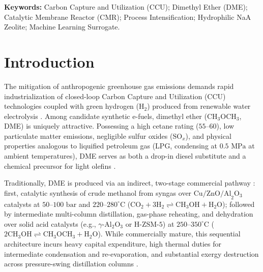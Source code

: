 \documentclass[12pt,a4paper]{article}
\begin{document}
\vspace{6pt}
\noindent\textbf{Keywords:} Carbon Capture and Utilization (CCU); Dimethyl Ether (DME); Catalytic Membrane Reactor (CMR); Process Intensification; Hydrophilic NaA Zeolite; Machine Learning Surrogate.

\newpage

\section{Introduction}
The mitigation of anthropogenic greenhouse gas emissions demands rapid industrialization of closed-loop Carbon Capture and Utilization (CCU) technologies coupled with green hydrogen ($\text{H}_2$) produced from renewable water electrolysis \cite{centi2009, hepburn2019}. Among candidate synthetic e-fuels, dimethyl ether ($\text{CH}_3\text{OCH}_3$, DME) is uniquely attractive. Possessing a high cetane rating ($55\text{--}60$), low particulate matter emissions, negligible sulfur oxides ($\text{SO}_x$), and physical properties analogous to liquified petroleum gas (LPG, condensing at $0.5\text{ MPa}$ at ambient temperatures), DME serves as both a drop-in diesel substitute and a chemical precursor for light olefins \cite{semelsberger2006, catizzone2018}.

Traditionally, DME is produced via an indirect, two-stage commercial pathway \cite{dieterich2020}: first, catalytic synthesis of crude methanol from syngas over $\text{Cu/ZnO/Al}_2\text{O}_3$ catalysts at $50\text{--}100\text{ bar}$ and $220\text{--}280^\circ\text{C}$ ($\text{CO}_2 + 3\text{H}_2 \rightleftharpoons \text{CH}_3\text{OH} + \text{H}_2\text{O}$); followed by intermediate multi-column distillation, gas-phase reheating, and dehydration over solid acid catalysts (e.g., $\gamma\text{-Al}_2\text{O}_3$ or $\text{H-ZSM-5}$) at $250\text{--}350^\circ\text{C}$ ($2\text{CH}_3\text{OH} \rightleftharpoons \text{CH}_3\text{OCH}_3 + \text{H}_2\text{O}$). While commercially mature, this sequential architecture incurs heavy capital expenditure, high thermal duties for intermediate condensation and re-evaporation, and substantial exergy destruction across pressure-swing distillation columns \cite{michailos2020}.
\end{document}
